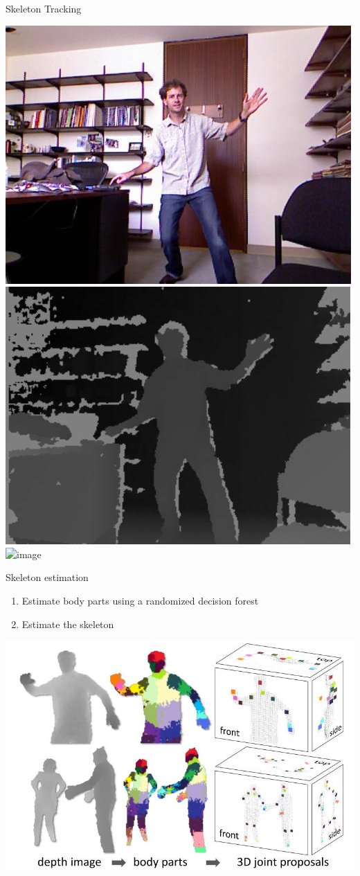 \documentclass[compress]{beamer}
\begin{document}
{
    \begin{frame}{Skeleton Tracking}

        \begin{center}
            \includegraphics[width=0.3\linewidth]{skeleton/skel3}
            \includegraphics[width=0.3\linewidth]{skeleton/skel2}
            \includegraphics<2>[width=0.3\linewidth]{skeleton/skel1}
        \end{center}
\end{frame}
}

{

\begin{frame}{Skeleton estimation}
    \begin{enumerate}
        \item Estimate body parts using a randomized decision forest
        \item Estimate the skeleton
    \end{enumerate}
    \begin{center}
        \includegraphics[width=0.8\linewidth]{skeleton/skeleton_estimation}
    \end{center}
\end{frame}
}
\end{document}
